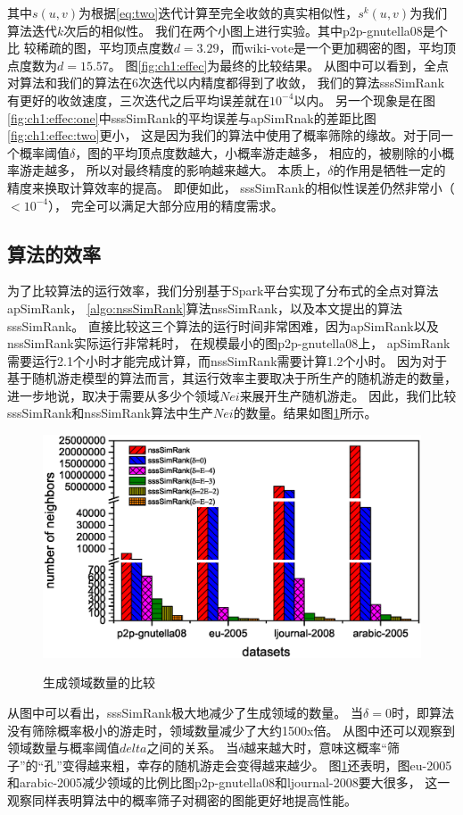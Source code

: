 \documentclass[master]{njuthesis}
\begin{document}
其中$s(u,v)$为根据\ref{eq:two}迭代计算至完全收敛的真实相似性，$s^k(u,v)$为我们算法迭代$k$次后的相似性。
我们在两个小图上进行实验。其中p2p-gnutella08是个比
较稀疏的图，平均顶点度数$d=3.29$，而wiki-vote是一个更加稠密的图，平均顶点度数为$d=15.57$。
图\ref{fig:ch1:effec}为最终的比较结果。
从图中可以看到，全点对算法和我们的算法在6次迭代以内精度都得到了收敛， 我们的算法sssSimRank有更好的收敛速度，三次迭代之后平均误差就在$10^{-4}$以内。
另一个现象是在图\ref{fig:ch1:effec:one}中sssSimRank的平均误差与apSimRnak的差距比图\ref{fig:ch1:effec:two}更小，
这是因为我们的算法中使用了概率筛除的缘故。对于同一个概率阈值$\delta$，图的平均顶点度数越大，小概率游走越多， 相应的，被剔除的小概率游走越多，
所以对最终精度的影响越来越大。 本质上，$\delta$的作用是牺牲一定的精度来换取计算效率的提高。
即便如此， sssSimRank的相似性误差仍然非常小（$<10^{-4}$）， 完全可以满足大部分应用的精度需求。
\subsection{算法的效率}
为了比较算法的运行效率，我们分别基于Spark平台实现了分布式的全点对算法apSimRank， \ref{algo:nssSimRank}算法nssSimRank，以及本文提出的算法sssSimRank。
直接比较这三个算法的运行时间非常困难，因为apSimRank以及nssSimRank实际运行非常耗时，
在规模最小的图p2p-gnutella08上， apSimRank需要运行2.1个小时才能完成计算，而nssSimRank需要计算1.2个小时。
因为对于基于随机游走模型的算法而言，其运行效率主要取决于所生产的随机游走的数量，进一步地说，取决于需要从多少个领域$Nei$来展开生产随机游走。
因此，我们比较sssSimRank和nssSimRank算法中生产$Nei$的数量。结果如图\ref{fig:ch1:runtime}所示。
\begin{figure}[h]
  \centering
  \includegraphics[width= 1\textwidth]{figure/neighborhoods.eps}\\
  \caption{生成领域数量的比较}\label{fig:ch1:runtime}
\end{figure}
从图中可以看出，sssSimRank极大地减少了生成领域的数量。
当$\delta=0$时，即算法没有筛除概率极小的游走时，领域数量减少了大约1500x倍。
从图中还可以观察到领域数量与概率阈值$delta$之间的关系。
当$\delta$越来越大时，意味这概率“筛子”的“孔”变得越来粗，幸存的随机游走会变得越来越少。
图\ref{fig:ch1:runtime}还表明，图eu-2005和arabic-2005减少领域的比例比图p2p-gnutella08和ljournal-2008要大很多，
这一观察同样表明算法中的概率筛子对稠密的图能更好地提高性能。
\end{document}
